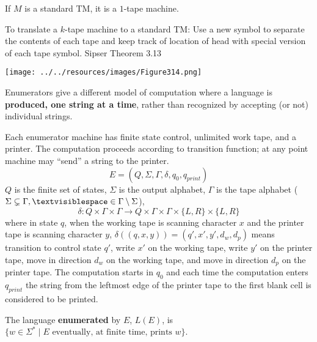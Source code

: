 \documentclass[12pt, oneside]{article}
\begin{document}
If $M$ is a standard  TM, it is a $1$-tape machine.


To translate a $k$-tape machine  to  a standard TM:
Use a  new symbol to separate the contents of each tape
and keep track of location of  head with  special version of each
tape symbol. {\tiny Sipser Theorem 3.13} 

\texttt{[image: ../../resources/images/Figure314.png]}

\newpage
{} Enumerators give a different
model of computation where a language is {\bf produced, one string at a time},
rather than recognized by accepting (or not) individual strings.

Each enumerator machine has finite state control, unlimited work tape, and a printer. The computation proceeds
according to transition function; at any point machine may ``send'' a string to the printer.
\[
E  = (Q, \Sigma, \Gamma, \delta, q_0, q_{print})  
\]
$Q$ is the finite set of states, $\Sigma$ is  the output alphabet, $\Gamma$ is the 
tape alphabet ($\Sigma  \subsetneq\Gamma, 
\textvisiblespace \in \Gamma \setminus \Sigma$), 
\[
\delta:  Q  \times  \Gamma \times \Gamma \to  Q \times  \Gamma \times  \Gamma \times \{L, R\} \times  \{L, R\}
\]
where in state $q$, when the working tape is scanning character $x$ and the printer tape is scanning character $y$,
$\delta( (q,x,y) ) = (q', x', y', d_w, d_p)$ means transition to control state $q'$, write $x'$ on 
the working tape, write $y'$ on the printer tape, move in direction $d_w$ on the working tape, and move in direction 
$d_p$ on the printer tape. The computation starts in $q_0$ and each time the computation enters $q_{print}$
the string from the leftmost edge of the printer tape to the first blank cell is considered to be printed.

The language  {\bf  enumerated} by  $E$, $L(E)$, is $\{ w \in \Sigma^* \mid \text{$E$ eventually, at finite  time, 
prints $w$} \}$.
\end{document}
